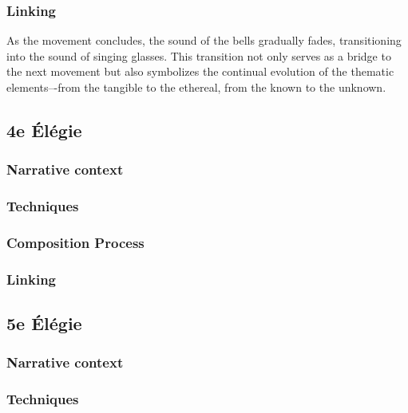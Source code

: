 \documentclass[12pt,twoside,maitrise]{dms}
\theoremstyle{definition}
\begin{document}

\subsubsection{Linking}

As the movement concludes, the sound of the bells gradually fades, transitioning into the sound of singing glasses.
This transition not only serves as a bridge to the next movement but also symbolizes the continual evolution of the thematic elements–-from the tangible to the ethereal, from the known to the unknown.

\subsection{4e Élégie}

\subsubsection{Narrative context}

\subsubsection{Techniques}

\subsubsection{Composition Process}

\subsubsection{Linking}

\subsection{5e Élégie}

\subsubsection{Narrative context}

\subsubsection{Techniques}
\end{document}

